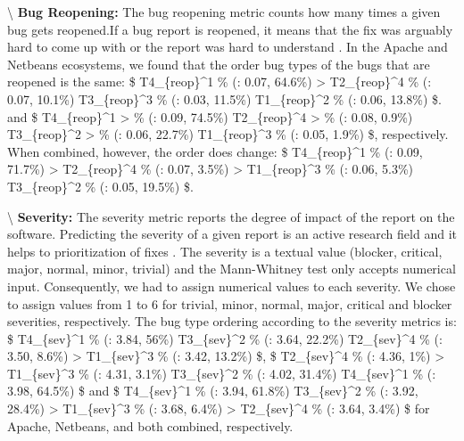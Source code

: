 \textbackslash{} \vspace{0.1cm} {\bf Bug Reopening: } The bug reopening
metric counts how many times a given bug gets reopened.If a bug report
is reopened, it means that the fix was arguably hard to come up with or
the report was hard to understand
\cite{Zimmermann2012}\cite{Shihab2010}\cite{Lo2013}. In the Apache and
Netbeans ecosystems, we found that the order bug types of the bugs that
are reopened is the same: \$ T4\_\{reop\}\^{}1 \% (\mu: 0.07, 64.6\%)
\textgreater{} T2\_\{reop\}\^{}4 \% (\mu: 0.07, 10.1\%) \gg
T3\_\{reop\}\^{}3 \% (\mu: 0.03, 11.5\%) \gg
T1\_\{reop\}\^{}2 \% (\mu: 0.06, 13.8\%) \$. and \$ T4\_\{reop\}\^{}1
\textgreater{} \% (\mu: 0.09, 74.5\%) T2\_\{reop\}\^{}4 \textgreater{}
\% (\mu: 0.08, 0.9\%) T3\_\{reop\}\^{}2 \textgreater{} \% (\mu: 0.06,
22.7\%) T1\_\{reop\}\^{}3 \% (\mu: 0.05, 1.9\%) \$, respectively. When
combined, however, the order does change: \$ T4\_\{reop\}\^{}1 \% (\mu:
0.09, 71.7\%) \textgreater{} T2\_\{reop\}\^{}4 \% (\mu: 0.07, 3.5\%)
\textgreater{} T1\_\{reop\}\^{}3 \% (\mu: 0.06, 5.3\%) \gg
T3\_\{reop\}\^{}2 \% (\mu: 0.05, 19.5\%) \$.

\textbackslash{} \vspace{0.1cm} {\bf Severity: } The severity metric
reports the degree of impact of the report on the software. Predicting
the severity of a given report is an active research field
\cite{Menzies2008,Guo2010,Lamkanfi2010,Tian2012,ValdiviaGarcia2014, Havelund2015}
and it helps to prioritization of fixes \cite{Xuan2012}. The severity is
a textual value (blocker, critical, major, normal, minor, trivial) and
the Mann-Whitney test only accepts numerical input. Consequently, we had
to assign numerical values to each severity. We chose to assign values
from 1 to 6 for trivial, minor, normal, major, critical and blocker
severities, respectively. The bug type ordering according to the
severity metrics is: \$ T4\_\{sev\}\^{}1 \% (\mu: 3.84, 56\%) \gg
T3\_\{sev\}\^{}2 \% (\mu: 3.64, 22.2\%) \gg
T2\_\{sev\}\^{}4 \% (\mu: 3.50, 8.6\%) \textgreater{} T1\_\{sev\}\^{}3
\% (\mu: 3.42, 13.2\%) \$, \$ T2\_\{sev\}\^{}4 \% (\mu: 4.36, 1\%)
\textgreater{} T1\_\{sev\}\^{}3 \% (\mu: 4.31, 3.1\%) \gg
T3\_\{sev\}\^{}2 \% (\mu: 4.02, 31.4\%) \gg
T4\_\{sev\}\^{}1 \% (\mu: 3.98, 64.5\%) \$ and \$ T4\_\{sev\}\^{}1 \%
(\mu: 3.94, 61.8\%) \gg
T3\_\{sev\}\^{}2 \% (\mu: 3.92, 28.4\%) \textgreater{} T1\_\{sev\}\^{}3
\% (\mu: 3.68, 6.4\%) \textgreater{} T2\_\{sev\}\^{}4 \% (\mu: 3.64,
3.4\%) \$ for Apache, Netbeans, and both combined, respectively.

